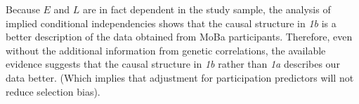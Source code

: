\documentclass[12pt]{article}
\begin{document}
Because $E$ and $L$ are in fact dependent in the study sample, the analysis of implied conditional independencies shows that the causal structure in \emph{1b} is a better description of the data obtained from MoBa participants. Therefore, even without the additional information from genetic correlations, the available evidence suggests that the causal structure in \emph{1b} rather than \emph{1a} describes our data better. (Which implies that adjustment for participation predictors will not reduce selection bias).



	


\printbibliography
\end{document}
